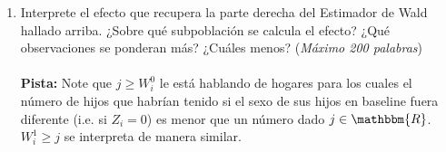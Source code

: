 \documentclass[a4paper, answers, addpoints, 11pt]{exam}
\newenvironment{solucion}{%
  \begin{mdframed}[
    backgroundcolor=blue!5,    %
    linecolor=blue!50,          %
    linewidth=2pt,              %
    leftmargin=10pt,            %
    rightmargin=8pt,           %
    topline=true,              %
    bottomline=true,            %
    roundcorner=10pt,           %
    innerleftmargin=10pt,       %
    innerrightmargin=10pt,      %
    innerbottommargin=10pt,     %
    innertopmargin=10pt         %
  ]%
  \begin{tcolorbox}[colframe=blue!50!black, colback=blue!50, coltitle=white, sharp corners=all, boxrule=1mm, width=\textwidth, halign=left, valign=center, top=0mm, bottom=0mm, left=0mm, right=0mm] \textbf{Solución} \end{tcolorbox} }{\end{mdframed}}
\begin{document}
\begin{enumerate}
\begin{enumerate}
        con\footnote{\footnotesize{También se puede demostrar que $0 \leq w_j \leq 1$ y $\sum_{j=2}^J w_j = 1$. Esto, solo para su conocimiento, no hace falta que lo pruebe.}} $w_j = \frac{P(W_i^1 \geq j \geq W_i^0 )}{\sum_{j=1}^J P(W_i^1 \geq j \geq W_i^0 )}$ 
        \begin{solucion}
        \begin{proof}
        Del punto b) sabemos que 
         \begin{equation*}
                 E[Y_i | Z_i = 1 ] - E[Y_i | Z_i = 0 ] = \sum_{j=2}^J \Big( E[\tau_i | W_i^1 \geq j > W_i^0]  \times  Pr[W_i^1 \geq j > W_i^0] \Big) 
            \end{equation*}
        Del punto c) sabemos que 
        \begin{equation*}
                E[W_i | Z_i = 1 ] - E[W_i | Z_i = 0 ] = \sum_{j=2}^J \Big( Pr[W_i^1 \geq j > W_i^0] \Big)
            \end{equation*}
       Entonces combinando esto
        \begin{align*}
            \frac{E[Y | Z_i = 1] - E[Y | Z_i = 0]}{E[W | Z_i = 1] - E[W | Z_i = 0]}  &= \frac{\sum_{j=2}^J \Big( E[\tau_i | W_i^1 \geq j > W_i^0]  \times  Pr[W_i^1 \geq j > W_i^0] \Big) }{\sum_{j=2}^J \Big( Pr[W_i^1 \geq j > W_i^0] \Big)}
        \end{align*}
        Defina $w_j = \frac{P(W_i^1 \geq j \geq W_i^0 )}{\sum_{j=2}^J P(W_i^1 \geq j \geq W_i^0 )}$. Entonces:
        \begin{align*}
                & = \sum_{j = 2}^J  E\Bigg[\tau_i |  W_i^1 \geq j \geq W_i^0 \Bigg] w_j
            \end{align*}
        \end{proof}
\end{solucion}

        
        \item Interprete el efecto que recupera la parte derecha del Estimador de Wald hallado arriba. ¿Sobre qué subpoblación se calcula el efecto? ¿Qué observaciones se ponderan más? ¿Cuáles menos? (\textit{Máximo 200 palabras})
        \\ \\ \textbf{Pista:} Note que $j \geq W_i^0$ le está hablando de hogares para los cuales el número de hijos que habrían tenido si el sexo de sus hijos en baseline fuera diferente (i.e. si $Z_i = 0$) es menor que un número dado $j \in \mathbbm{R}$. $W_i^1 \geq j$ se interpreta de manera similar.
        \end{enumerate}


\end{enumerate}
\end{document}
